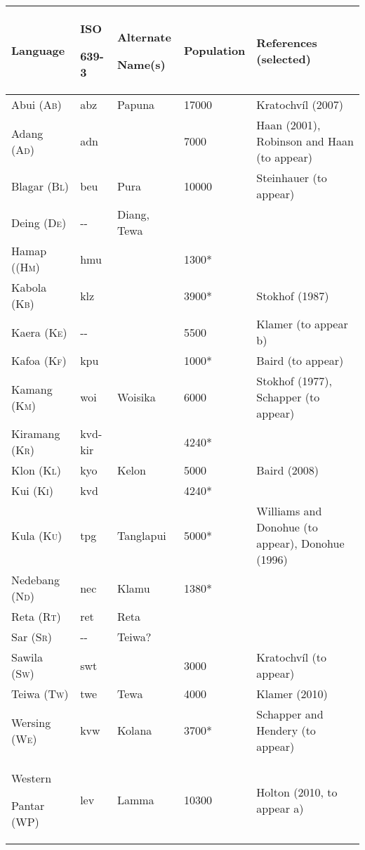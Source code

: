 \begin{center}
\tablehead{}
\begin{supertabular}{m{1.1983598in}m{0.54275984in}m{0.9497598in}m{0.9115598in}m{2.1538599in}}
\hline
\bfseries Language &
{\bfseries ISO }

\bfseries 639-3 &
{\bfseries Alternate }

\bfseries Name(s) &
\textbf{Population}\footnotemark{} &
\bfseries References (selected)\\\hline
Abui (A\textsc{b)} &
abz &
Papuna &
17000 &
Kratochv\'il (2007)\\
Adang (A\textsc{d)} &
adn &
 &
7000 &
Haan (2001), Robinson and Haan (to appear)\\
Blagar (B\textsc{l)} &
beu &
Pura &
10000 &
Steinhauer (to appear)\\
Deing (D\textsc{e)} &
{}-{}- &
Diang, Tewa &
 &
\\
Hamap ((H\textsc{m)} &
hmu &
 &
1300* &
\\
Kabola (K\textsc{b)} &
klz &
 &
3900* &
Stokhof (1987)\\
Kaera (K\textsc{e)}  &
{}-{}- &
 &
5500 &
Klamer (to appear b)\\
Kafoa (K\textsc{f)} &
kpu &
 &
1000* &
Baird (to appear)\\
Kamang (K\textsc{m)} &
woi &
Woisika &
6000 &
Stokhof (1977), Schapper (to appear)\\
Kiramang (K\textsc{r)} &
kvd-kir &
 &
4240* &
\\
Klon (K\textsc{l)} &
kyo &
Kelon &
5000 &
Baird (2008)\\
Kui (K\textsc{i)} &
kvd &
 &
4240* &
\\
Kula (K\textsc{u)} &
tpg &
Tanglapui &
5000* &
Williams and Donohue (to appear), Donohue (1996)\\
Nedebang (N\textsc{d)} &
nec &
Klamu &
1380* &
\\
Reta (R\textsc{t)}  &
ret &
Reta &
 &
\\
Sar (S\textsc{r)} &
{}-{}- &
Teiwa? &
 &
\\
Sawila (S\textsc{w)} &
swt &
 &
3000 &
Kratochv\'il (to appear)\\
Teiwa (T\textsc{w)} &
twe &
Tewa &
4000 &
Klamer (2010)\\
Wersing (W\textsc{e)} &
kvw &
Kolana &
3700* &
Schapper and Hendery (to appear)\\
Western 

Pantar (WP) &
lev &
Lamma &
10300 &
Holton (2010, to appear a)\\\hline
\end{supertabular}
\end{center}

